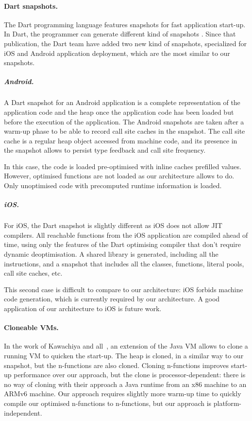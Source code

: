 \documentclass[a4paper,12pt,twoside]{../includes/ThesisStyle}
\begin{document}
\paragraph{Dart snapshots.}

The Dart programming language features snapshots for fast application start-up. In Dart, the programmer can generate different kind of snapshots \cite{Anna13a}. Since that publication, the Dart team have added two new kind of snapshots, specialized for iOS and Android application deployment, which are the most similar to our snapshots.

\subparagraph{Android.} A Dart snapshot for an Android application is a complete representation of the application code and the heap once the application code has been loaded but before the execution of the application. The Android snapshots are taken after a warm-up phase to be able to record call site caches in the snapshot. The call site cache is a regular heap object accessed from machine code, and its presence in the snapshot allows to persist type feedback and call site frequency.

In this case, the code is loaded pre-optimised with inline caches prefilled values. However, optimised functions are not loaded as our architecture allows to do. Only unoptimised code with precomputed runtime information is loaded.

\subparagraph{iOS.} For iOS, the Dart snapshot is slightly different as iOS does not allow JIT compilers. All reachable functions from the iOS application are compiled ahead of time, using only the features of the Dart optimising compiler that don't require dynamic deoptimisation. A shared library is generated, including all the instructions, and a snapshot that includes all the classes, functions, literal pools, call site caches, etc.

This second case is difficult to compare to our architecture: iOS forbids machine code generation, which is currently required by our architecture. A good application of our architecture to iOS is future work.

\paragraph{Cloneable VMs.}

In the work of Kawachiya and all~\cite{Kawa07a}, an extension of the Java VM allows to clone a running VM to quicken the start-up. The heap is cloned, in a similar way to our snapshot, but the n-functions are also cloned. Cloning n-functions improves start-up performance over our approach, but the clone is processor-dependent: there is no way of cloning with their approach a Java runtime from an x86 machine to an ARMv6 machine. Our approach requires slightly more warm-up time to quickly compile our optimised n-functions to n-functions, but our approach is platform-independent.
\end{document}
